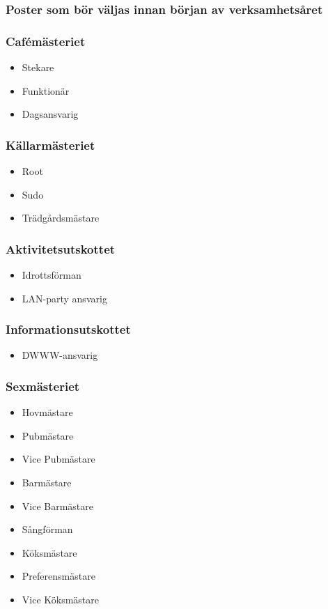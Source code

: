 \documentclass{dsekkallelse}
\begin{document}
\subsubsection{Poster som bör väljas innan början av verksamhetsåret}
\begin{multicols}{2}

\subsubsection{Cafémästeriet}
\begin{itemize}
    \item Stekare
    \item Funktionär
    \item Dagsansvarig
\end{itemize}

\subsubsection{Källarmästeriet}
\begin{itemize}
    \item Root
    \item Sudo
    \item Trädgårdsmästare
\end{itemize}

\subsubsection{Aktivitetsutskottet}
\begin{itemize}
    \item Idrottsförman
    \item LAN-party ansvarig
\end{itemize}

\subsubsection{Informationsutskottet}
\begin{itemize}
    \item DWWW-ansvarig
\end{itemize}

\subsubsection{Sexmästeriet}
\begin{itemize}
    \item Hovmästare
    \item Pubmästare
    \item Vice Pubmästare
    \item Barmästare
    \item Vice Barmästare
    \item Sångförman
    \item Köksmästare
    \item Preferensmästare
    \item Vice Köksmästare
\end{itemize}


\end{multicols}
\end{document}
